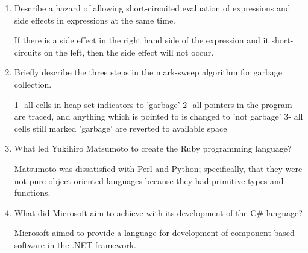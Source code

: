 \begin{enumerate}
\begin{answer}
    \end{answer}

  \item Describe a hazard of allowing short-circuited evaluation
    of expressions and side effects in expressions at the same time.

  \begin{answer}

    If there is a side effect in the right hand side of the expression and
    it short-circuits on the left, then the side effect will not occur.

    \end{answer}

  \item Briefly describe the three steps in the mark-sweep algorithm
    for garbage collection.

  \begin{answer}

    1- all cells in heap set indicators to 'garbage'
    2- all pointers in the program are traced, and anything which is pointed
       to is changed to 'not garbage'
    3- all cells still marked 'garbage' are reverted to available space

    \end{answer}

  \item What led Yukihiro Matsumoto to create the Ruby programming language?

  \begin{answer}

    Matsumoto was dissatisfied with Perl and Python; specifically, that they
    were not pure object-oriented languages because they had primitive types
    and functions.

    \end{answer}

  \item What did Microsoft aim to achieve with its development of the
    C\# language?

  \begin{answer}

    Microsoft aimed to provide a language for development of component-based
    software in the .NET framework.

    \end{answer}

  \end{enumerate}


